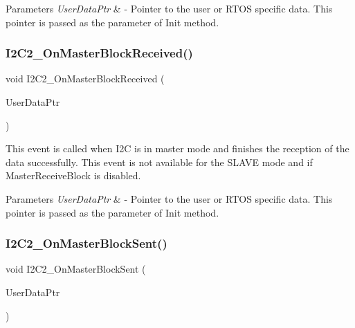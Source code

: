 \begin{DoxyParams}{Parameters}
{\em User\+Data\+Ptr} & -\/ Pointer to the user or R\+T\+OS specific data. This pointer is passed as the parameter of Init method. \\
\hline
\end{DoxyParams}
\mbox{\label{group___events__module_ga5b2fe0871600de8d73184570a42e5b66}} 
\subsubsection{\texorpdfstring{I2\+C2\+\_\+\+On\+Master\+Block\+Received()}{I2C2\_OnMasterBlockReceived()}}
{\footnotesize\ttfamily void I2\+C2\+\_\+\+On\+Master\+Block\+Received (\begin{DoxyParamCaption}\item[{\hyperlink{group___p_e___types__module_ga0b66a73f87238a782318aa0be7578e35}{L\+D\+D\+\_\+\+T\+User\+Data} $\ast$}]{User\+Data\+Ptr }\end{DoxyParamCaption})}



This event is called when I2C is in master mode and finishes the reception of the data successfully. This event is not available for the S\+L\+A\+VE mode and if Master\+Receive\+Block is disabled. 


\begin{DoxyParams}{Parameters}
{\em User\+Data\+Ptr} & -\/ Pointer to the user or R\+T\+OS specific data. This pointer is passed as the parameter of Init method. \\
\hline
\end{DoxyParams}
\mbox{\label{group___events__module_ga23f378d5253016b341bf971cb5c35ee7}} 
\subsubsection{\texorpdfstring{I2\+C2\+\_\+\+On\+Master\+Block\+Sent()}{I2C2\_OnMasterBlockSent()}}
{\footnotesize\ttfamily void I2\+C2\+\_\+\+On\+Master\+Block\+Sent (\begin{DoxyParamCaption}\item[{\hyperlink{group___p_e___types__module_ga0b66a73f87238a782318aa0be7578e35}{L\+D\+D\+\_\+\+T\+User\+Data} $\ast$}]{User\+Data\+Ptr }\end{DoxyParamCaption})}



